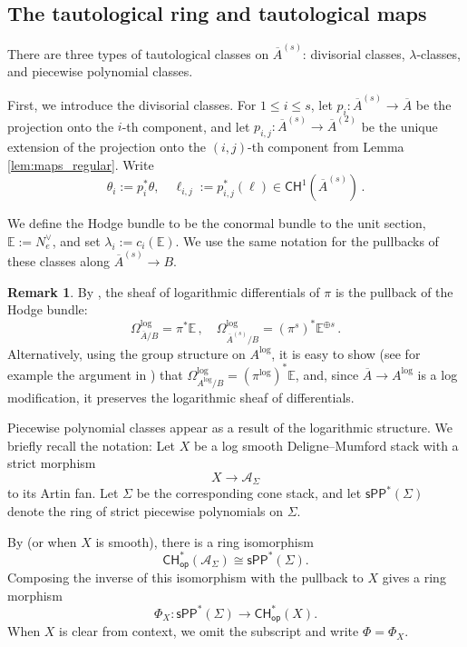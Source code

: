\documentclass[11pt]{article}
\def\CH{\mathsf{CH}}
\def\CHop{\mathsf{CH}_{\mathsf{op}}}
\def\EE{\mathbb{E}}
\renewcommand{\log}{\mathrm{log}}
\newcommand{\barA}{\overline{A}}
\newcommand{\logA}{{A^{\log}}}
\newcommand{\sPP}{\mathsf{sPP}}
\newcommand{\spp}{\sPP}
\theoremstyle{definition}
\newtheorem{remark}[definition]{Remark}
\begin{document}
\subsection{The tautological ring and tautological maps}\label{sec:taut_def}

There are three types of tautological classes on $\barA^{(s)}$: divisorial classes, $\lambda$-classes, and piecewise polynomial classes.

First, we introduce the divisorial classes. For $1 \le i \le s$, let $p_i :\barA^{(s)} \to \barA$ be the projection onto the $i$-th component, and let $p_{i,j} :\barA^{(s)} \to \barA^{(2)}$ be the unique extension of the projection onto the $(i,j)$-th component from Lemma \ref{lem:maps_regular}. Write
\[
\theta_i := p_i^*\theta, \quad \ell_{i,j} := p_{i,j}^*(\ell) \in \CH^1(\barA^{(s)})\,.
\]

We define the Hodge bundle to be the conormal bundle to the unit section, $\EE := N_e^\vee$, and set $\lambda_i := c_i(\EE)$. We use the same notation for the pullbacks of these classes along $\barA^{(s)} \to B$.

\begin{remark}\label{rem:Hodge_is_Omlog}
    By \cite[Chapter IV. Theorem 1.1.]{FC}, the sheaf of logarithmic differentials of $\pi$ is the pullback of the Hodge bundle:
    $$
    \Omega_{\barA/B}^{\log} = \pi^* \mathbb E\, ,\quad \Omega^{\log}_{\barA^{(s)}/B} =(\pi^s)^* \mathbb E^{\oplus s}\,.
    $$
    Alternatively, using the group structure on $\logA$, it is easy to show (see for example the argument in \cite[Tag 047I]{stacks-project}) that $\Omega_{\logA/B}^{\log} = (\pi^{\log})^*\mathbb E$, and, since $\barA\to \logA$ is a log modification, it preserves the logarithmic sheaf of differentials.
\end{remark}

Piecewise polynomial classes appear as a result of the logarithmic structure. We briefly recall the notation: Let $X$ be a log smooth Deligne--Mumford stack with a strict morphism
\[
X \to \mathcal A_\Sigma
\]
to its Artin fan. Let $\Sigma$ be the corresponding cone stack, and let $\spp^{\ast}(\Sigma)$ denote the ring of strict piecewise polynomials on $\Sigma$.

By \cite[Theorem B]{A_case_study_of_Molcho_2021} (or \cite[Theorem 14]{MPS} when $X$ is smooth), there is a ring isomorphism
\[
\CHop^*(\mathcal A_\Sigma) \cong \spp^{\ast}(\Sigma).
\]
Composing the inverse of this isomorphism with the pullback to $X$ gives a ring morphism
\begin{equation}\label{eq:Phi}
    \Phi_X : \spp^{\ast}(\Sigma) \longrightarrow \CHop^*(X).
\end{equation}
When $X$ is clear from context, we omit the subscript and write $\Phi=\Phi_X$.
\end{document}
